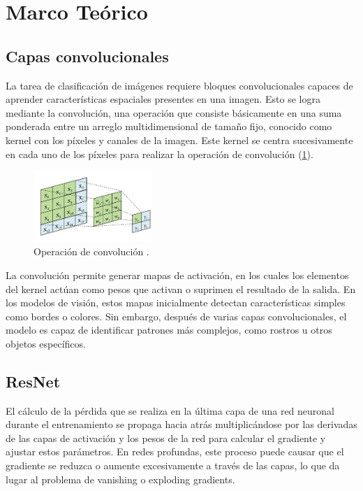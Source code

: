 \documentclass[twocolumn]{article}
\begin{document}
\section{Marco Teórico}
\subsection{Capas convolucionales}
La tarea de clasificación de imágenes requiere bloques convolucionales capaces de aprender características espaciales presentes en una imagen. Esto se logra mediante la convolución, una operación que consiste básicamente en una suma ponderada entre un arreglo multidimensional de tamaño fijo, conocido como kernel con los píxeles y canales de la imagen. Este kernel se centra sucesivamente en cada uno de los píxeles para realizar la operación de convolución (\ref{fig:convdiag}).

\begin{figure}[!ht]
\centering
\includegraphics[width=0.4\textwidth]{assets/conv.jpg}
\caption{Operación de convolución \cite{matrixconvsource}.}
\label{fig:convdiag}
\end{figure}

La convolución permite generar mapas de activación, en los cuales los elementos del kernel actúan como pesos que activan o suprimen el resultado de la salida. En los modelos de visión, estos mapas inicialmente detectan características simples como bordes o colores. Sin embargo, después de varias capas convolucionales, el modelo es capaz de identificar patrones más complejos, como rostros u otros objetos específicos.

\subsection{ResNet}
El cálculo de la pérdida que se realiza en la última capa de una red neuronal durante el entrenamiento se propaga hacia atrás multiplicándose por las derivadas de las capas de activación y los pesos de la red para calcular el gradiente y ajustar estos parámetros. En redes profundas, este proceso puede causar que el gradiente se reduzca o aumente excesivamente a través de las capas, lo que da lugar al problema de vanishing o exploding gradients.
\end{document}
